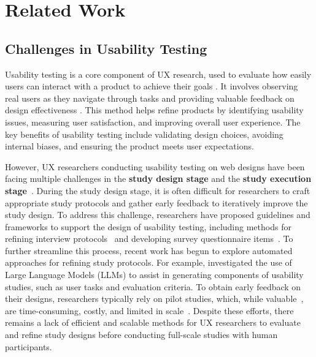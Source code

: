 \documentclass[manuscript,review,anonymous]{acmart}
\begin{document}
\section{Related Work}
\subsection{Challenges in Usability Testing}
Usability testing is a core component of UX research, used to evaluate how easily users can interact with a product to achieve their goals \cite{shawHandbookUsabilityTesting1996a,barnum2020usability, bastienUsabilityTestingReview2010, lewis2012usability}.
It involves observing real users as they navigate through tasks and providing valuable feedback on design effectiveness \cite{barnum2020usability}. 
This method helps refine products by identifying usability issues, measuring user satisfaction, and improving overall user experience. The key benefits of usability testing include validating design choices, avoiding internal biases, and ensuring the product meets user expectations.

However, UX researchers conducting usability testing on web designs have been facing multiple challenges in the \textbf{study design stage} and the \textbf{study execution stage}~\cite{folstadAnalysisPracticalUsability2012, hertzumEvaluatorEffectChilling2003, kuangMergingResultsNo2022, norgaardWhatUsabilityEvaluators2006}.  
During the study design stage, it is often difficult for researchers to craft appropriate study protocols and gather early feedback to iteratively improve the study design.  
To address this challenge, researchers have proposed guidelines and frameworks to support the design of usability testing, including methods for refining interview protocols~\cite{castillo2016preparing, shoozan2024application, roberts2020qualitative} and developing survey questionnaire items~\cite{rasinski2008designing, muller2015designing, muller2014survey, koelle2020social}.
To further streamline this process, recent work has begun to explore automated approaches for refining study protocols. For example, \citet{calvanoLeveragingLargeLanguage2025} investigated the use of Large Language Models (LLMs) to assist in generating components of usability studies, such as user tasks and evaluation criteria.  
To obtain early feedback on their designs, researchers typically rely on pilot studies, which, while valuable~\cite{hertzog2008considerations, truong2017pilot, van2001importance, oppenlaender2024state}, are time-consuming, costly, and limited in scale~\cite{Janaka2024, oppenlaender2021hardhats}.  
Despite these efforts, there remains a lack of efficient and scalable methods for UX researchers to evaluate and refine study designs before conducting full-scale studies with human participants.
\end{document}
